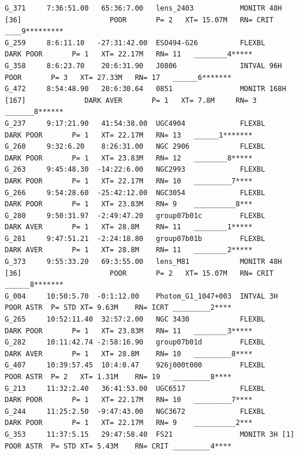 \begin{landscape}
\begin{verbatim}
G_371     7:36:51.00   65:36:7.00   lens_2403           MONITR 48H [36]                     POOR       P= 2   XT= 15.07M   RN= CRIT ____9*********
G_259     8:6:11.10   -27:31:42.00  ESO494-G26          FLEXBL                         DARK POOR       P= 1   XT= 22.17M   RN= 11   ________4*****
G_358     8:6:23.70    20:6:31.90   J0806               INTVAL 96H                          POOR       P= 3   XT= 27.33M   RN= 17   ______6*******
G_472     8:54:48.90   20:6:30.64   0851                MONITR 168H [167]              DARK AVER       P= 1   XT= 7.8M     RN= 3    _______8******
G_237     9:17:21.90   41:54:38.00  UGC4904             FLEXBL                         DARK POOR       P= 1   XT= 22.17M   RN= 13   ______1*******
G_260     9:32:6.20    8:26:31.00   NGC 2906            FLEXBL                         DARK POOR       P= 1   XT= 23.83M   RN= 12   ________8*****
G_263     9:45:48.30  -14:22:6.00   NGC2993             FLEXBL                         DARK POOR       P= 1   XT= 22.17M   RN= 10   _________7****
G_266     9:54:28.60  -25:42:12.00  NGC3054             FLEXBL                         DARK POOR       P= 1   XT= 23.83M   RN= 9    __________8***
G_280     9:50:31.97  -2:49:47.20   group07b01c         FLEXBL                         DARK AVER       P= 1   XT= 28.8M    RN= 11   ________1*****
G_281     9:47:51.21  -2:24:18.80   group07b01b         FLEXBL                         DARK AVER       P= 1   XT= 28.8M    RN= 11   ________2*****
G_373     9:55:33.20   69:3:55.00   lens_M81            MONITR 48H [36]                     POOR       P= 2   XT= 15.07M   RN= CRIT ______8*******
G_004     10:50:5.70  -0:1:12.00    Photom_G1_1047+003  INTVAL 3H                           POOR ASTR  P= STD XT= 9.63M    RN= ICRT _________2****
G_265     10:52:11.40  32:57:2.00   NGC 3430            FLEXBL                         DARK POOR       P= 1   XT= 23.83M   RN= 11   ________3*****
G_282     10:11:42.74 -2:58:16.90   group07b01d         FLEXBL                         DARK AVER       P= 1   XT= 28.8M    RN= 10   _________8****
G_407     10:39:57.45  10:4:0.47    926j000t000         FLEXBL                              POOR ASTR  P= 2   XT= 1.31M    RN= 19   _________8****
G_213     11:32:2.40   36:41:53.00  UGC6517             FLEXBL                         DARK POOR       P= 1   XT= 22.17M   RN= 10   _________7****
G_244     11:25:2.50  -9:47:43.00   NGC3672             FLEXBL                         DARK POOR       P= 1   XT= 22.17M   RN= 9    __________2***
G_353     11:37:5.15   29:47:58.40  FS21                MONITR 3H [1]                       POOR ASTR  P= STD XT= 5.43M    RN= CRIT _________4****

\end{verbatim}
\end{landscape}
